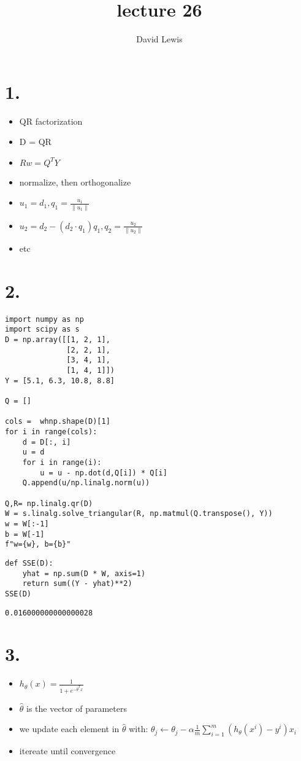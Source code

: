 \documentclass[11pt]{article}
\author{David Lewis}
\date{}
\title{lecture 26}
\begin{document}
\maketitle
\section*{1.}
\label{sec:org1cf6e9d}
\begin{itemize}
\item QR factorization
\item D = QR
\item \(Rw = Q^TY\)
\item normalize, then orthogonalize
\item \(u_1 = d_1, q_1 = \frac{u_1}{\|u_1\|}\)
\item \(u_2 = d_2 - (d_2 \cdot q_1)q_1, q_2 = \frac{u_2}{\|u_2\|}\)
\item etc
\end{itemize}
\section*{2.}
\label{sec:org91e72d1}
\begin{verbatim}
import numpy as np
import scipy as s
D = np.array([[1, 2, 1],
              [2, 2, 1],
              [3, 4, 1],
              [1, 4, 1]])
Y = [5.1, 6.3, 10.8, 8.8]

Q = []

cols =  whnp.shape(D)[1]
for i in range(cols):
    d = D[:, i]
    u = d
    for i in range(i):
        u = u - np.dot(d,Q[i]) * Q[i]
    Q.append(u/np.linalg.norm(u))

Q,R= np.linalg.qr(D)
W = s.linalg.solve_triangular(R, np.matmul(Q.transpose(), Y))
w = W[:-1]
b = W[-1]
f"w={w}, b={b}"
\end{verbatim}

\begin{verbatim}
def SSE(D):
    yhat = np.sum(D * W, axis=1)
    return sum((Y - yhat)**2)
SSE(D)
\end{verbatim}

\begin{verbatim}
0.016000000000000028
\end{verbatim}
\section*{3.}
\label{sec:orga5e826e}
\begin{itemize}
\item \(h_\theta(x) = \frac{1}{1+ e^{-\hat \theta^Tx}}\)
\item \(\hat \theta\) is the vector of parameters
\item we update each element in \(\hat \theta\) with:
\(\theta_j \leftarrow \theta_j - \alpha\frac{1}{m} \sum\limits^m_{i=1}(h_{\theta}(x^i) - y^i)x_i\)
\item itereate until convergence
\end{itemize}
\end{document}
